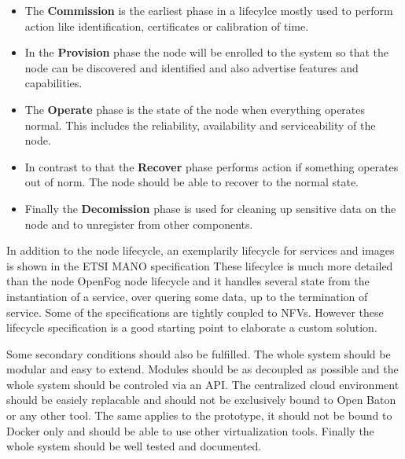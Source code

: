 \begin{itemize}
  \item The \textbf{Commission} is the earliest phase in a lifecylce mostly used to perform action like identification, certificates or calibration of time.\autocite[p. 52]{OpenFog:2017}
  \item In the \textbf{Provision} phase the node will be enrolled to the system so that the node can be discovered and identified and also advertise features and capabilities.\autocite[p. 52]{OpenFog:2017}
  \item The \textbf{Operate} phase is the state of the node when everything operates normal. This includes the reliability, availability and serviceability of the node.\autocite[p. 52]{OpenFog:2017}
  \item In contrast to that the \textbf{Recover} phase performs action if something operates out of norm.\autocite[p. 52]{OpenFog:2017} The node should be able to recover to the normal state.\autocite[p. 52]{OpenFog:2017}
  \item Finally the \textbf{Decomission} phase is used for cleaning up sensitive data on the node and to unregister from other components.
\end{itemize}

In addition to the node lifecycle, an exemplarily lifecycle for services and images is shown in the \ac{ETSI} \ac{MANO} specification\autocite[p. 67 ff.]{ETSI:MANO:2014}
These lifecylce is much more detailed than the node OpenFog node lifecycle and it handles several state from the instantiation of a service, over quering some data, up to the termination of service.
Some of the specifications are tightly coupled to \acp{NFV}.
However these lifecycle specification is a good starting point to elaborate a custom solution.

Some secondary conditions should also be fulfilled.
The whole system should be modular and easy to extend.
Modules should be as decoupled as possible and the whole system should be controled via an \ac{API}.
The centralized cloud environment should be easiely replacable and should not be exclusively bound to Open Baton or any other tool.
The same applies to the prototype, it should not be bound to Docker only and should be able to use other virtualization tools.
Finally the whole system should be well tested and documented.


